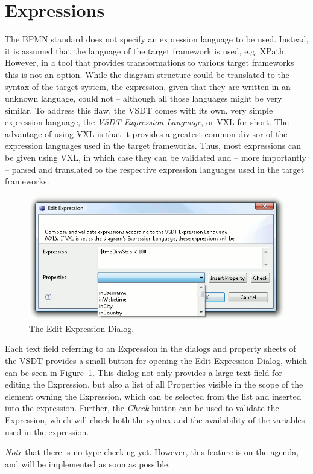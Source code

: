 \section{Expressions}
\label{sec:user_features_exp}

The BPMN standard does not specify an expression language to be used. Instead, it is assumed that the language of the target framework is used, e.g. XPath.  However, in a tool that provides transformations to various target frameworks this is not an option. While the diagram structure could be translated to the syntax of the target system, the expression, given that they are written in an unknown language, could not -- although all those languages might be very similar.  To address this flaw, the VSDT comes with its own, very simple expression language, the \emph{VSDT Expression Language}, or VXL for short.  The advantage of using VXL is that it provides a greatest common divisor of the expression languages used in the target frameworks.  Thus, most expressions can be given using VXL, in which case they can be validated and -- more importantly -- parsed and translated to the respective expression languages used in the target frameworks.

\begin{figure}[ht]
	\centering
	\includegraphics[width=.5\textwidth]{figures/features/editExp.png}
	\caption{The Edit Expression Dialog.}
	\label{fig:editExp}
\end{figure}

Each text field referring to an Expression in the dialogs and property sheets of the VSDT provides a small button for opening the Edit Expression Dialog, which can be seen in Figure~\ref{fig:editExp}.  This dialog not only provides a large text field for editing the Expression, but also a list of all Properties visible in the scope of the element owning the Expression, which can be selected from the list and inserted into the expression. Further, the \emph{Check} button can be used to validate the Expression, which will check both the syntax and the availability of the variables used in the expression.

\emph{Note} that there is no type checking yet. However, this feature is on the agenda, and will be implemented as soon as possible.

